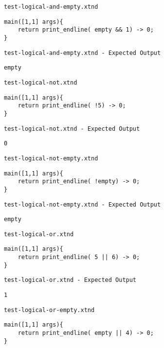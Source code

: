 \medskip \noindent \texttt{test-logical-and-empty.xtnd}


\begin{lstlisting}
main([1,1] args){
	return print_endline( empty && 1) -> 0;
}
\end{lstlisting}


\medskip \noindent \texttt{test-logical-and-empty.xtnd - Expected Output}


\begin{lstlisting}
empty
\end{lstlisting}


\medskip \noindent \texttt{test-logical-not.xtnd}


\begin{lstlisting}
main([1,1] args){
	return print_endline( !5) -> 0;
}
\end{lstlisting}


\medskip \noindent \texttt{test-logical-not.xtnd - Expected Output}


\begin{lstlisting}
0
\end{lstlisting}


\medskip \noindent \texttt{test-logical-not-empty.xtnd}


\begin{lstlisting}
main([1,1] args){
	return print_endline( !empty) -> 0;
}
\end{lstlisting}


\medskip \noindent \texttt{test-logical-not-empty.xtnd - Expected Output}


\begin{lstlisting}
empty
\end{lstlisting}


\medskip \noindent \texttt{test-logical-or.xtnd}


\begin{lstlisting}
main([1,1] args){
	return print_endline( 5 || 6) -> 0;
}
\end{lstlisting}


\medskip \noindent \texttt{test-logical-or.xtnd - Expected Output}


\begin{lstlisting}
1
\end{lstlisting}


\medskip \noindent \texttt{test-logical-or-empty.xtnd}


\begin{lstlisting}
main([1,1] args){
	return print_endline( empty || 4) -> 0;
}
\end{lstlisting}


